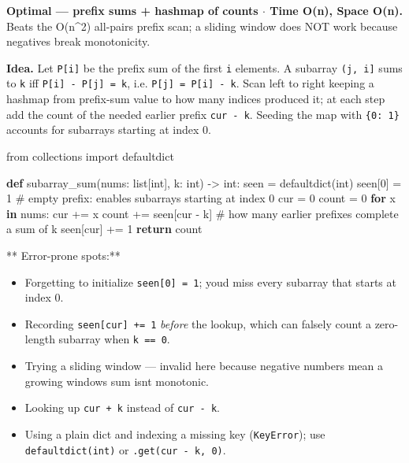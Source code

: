 \documentclass[11pt]{article}
\providecommand{\tightlist}{\setlength{\itemsep}{1pt}\setlength{\parskip}{0pt}}
\newenvironment{Shaded}{\begin{snugshade}}{\end{snugshade}}
\newcommand{\BuiltInTok}[1]{\textcolor[rgb]{0.50,0.55,0.55}{#1}}
\newcommand{\CommentTok}[1]{\textcolor[rgb]{0.48,0.49,0.49}{#1}}
\newcommand{\ControlFlowTok}[1]{\textcolor[rgb]{0.99,0.74,0.29}{\textbf{#1}}}
\newcommand{\DecValTok}[1]{\textcolor[rgb]{0.96,0.45,0.00}{#1}}
\newcommand{\ImportTok}[1]{\textcolor[rgb]{0.15,0.68,0.38}{#1}}
\newcommand{\KeywordTok}[1]{\textcolor[rgb]{0.81,0.81,0.76}{\textbf{#1}}}
\newcommand{\NormalTok}[1]{\textcolor[rgb]{0.81,0.81,0.76}{#1}}
\newcommand{\OperatorTok}[1]{\textcolor[rgb]{0.81,0.81,0.76}{#1}}
\begin{document}
\textbf{Optimal --- prefix sums + hashmap of counts \(\cdot\) Time O(n), Space O(n).} Beats the O(n\^{}2) all-pairs prefix scan; a sliding window does NOT work because negatives break monotonicity.

\textbf{Idea.} Let \texttt{P{[}i{]}} be the prefix sum of the first \texttt{i} elements. A subarray \texttt{(j,\ i{]}} sums to \texttt{k} iff \texttt{P{[}i{]}\ -\ P{[}j{]}\ =\ k}, i.e. \texttt{P{[}j{]}\ =\ P{[}i{]}\ -\ k}. Scan left to right keeping a hashmap from prefix-sum value to how many indices produced it; at each step add the count of the needed earlier prefix \texttt{cur\ -\ k}. Seeding the map with \texttt{\{0:\ 1\}} accounts for subarrays starting at index 0.


\begin{Shaded}
\begin{Highlighting}[]
\ImportTok{from}\NormalTok{ collections }\ImportTok{import}\NormalTok{ defaultdict}

\KeywordTok{def}\NormalTok{ subarray\_sum(nums: }\BuiltInTok{list}\NormalTok{[}\BuiltInTok{int}\NormalTok{], k: }\BuiltInTok{int}\NormalTok{) }\OperatorTok{{-}\textgreater{}} \BuiltInTok{int}\NormalTok{:}
\NormalTok{    seen }\OperatorTok{=}\NormalTok{ defaultdict(}\BuiltInTok{int}\NormalTok{)}
\NormalTok{    seen[}\DecValTok{0}\NormalTok{] }\OperatorTok{=} \DecValTok{1}               \CommentTok{\# empty prefix: enables subarrays starting at index 0}
\NormalTok{    cur }\OperatorTok{=} \DecValTok{0}
\NormalTok{    count }\OperatorTok{=} \DecValTok{0}
    \ControlFlowTok{for}\NormalTok{ x }\KeywordTok{in}\NormalTok{ nums:}
\NormalTok{        cur }\OperatorTok{+=}\NormalTok{ x}
\NormalTok{        count }\OperatorTok{+=}\NormalTok{ seen[cur }\OperatorTok{{-}}\NormalTok{ k]   }\CommentTok{\# how many earlier prefixes complete a sum of k}
\NormalTok{        seen[cur] }\OperatorTok{+=} \DecValTok{1}
    \ControlFlowTok{return}\NormalTok{ count}
\end{Highlighting}
\end{Shaded}

** Error-prone spots:**

\begin{itemize}
\tightlist
\item
  Forgetting to initialize \texttt{seen{[}0{]}\ =\ 1}; you\textquotesingle d miss every subarray that starts at index 0.
\item
  Recording \texttt{seen{[}cur{]}\ +=\ 1} \emph{before} the lookup, which can falsely count a zero-length subarray when \texttt{k\ ==\ 0}.
\item
  Trying a sliding window --- invalid here because negative numbers mean a growing window\textquotesingle s sum isn\textquotesingle t monotonic.
\item
  Looking up \texttt{cur\ +\ k} instead of \texttt{cur\ -\ k}.
\item
  Using a plain dict and indexing a missing key (\texttt{KeyError}); use \texttt{defaultdict(int)} or \texttt{.get(cur\ -\ k,\ 0)}.
\end{itemize}
\end{document}
